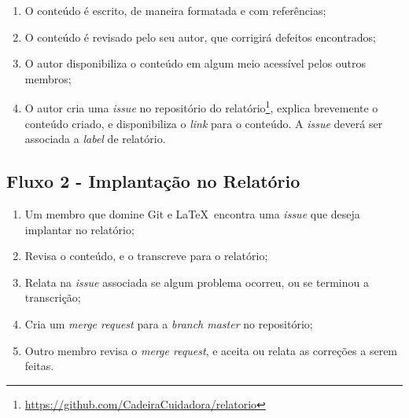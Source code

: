 \begin{enumerate}
  \item O conteúdo é escrito, de maneira formatada e com referências;
  \item O conteúdo é revisado pelo seu autor, que corrigirá defeitos encontrados;
  \item O autor disponibiliza o conteúdo em algum meio acessível pelos outros membros;
  \item O autor cria uma \textit{issue} no repositório do
    relatório\footnote{\url{https://github.com/CadeiraCuidadora/relatorio}}, explica brevemente
    o conteúdo criado, e disponibiliza o \textit{link} para o conteúdo. A \textit{issue} deverá ser associada a \textit{label} de relatório.
\end{enumerate}

\subsection{Fluxo 2 - Implantação no Relatório}

\begin{enumerate}
  \item Um membro que domine Git e \LaTeX\ encontra uma \textit{issue} que deseja
  implantar no relatório;
  \item Revisa o conteúdo, e o transcreve para o relatório;
  \item Relata na \textit{issue} associada se algum problema ocorreu, ou se terminou a transcrição;
  \item Cria um \textit{merge request} para a \textit{branch master} no repositório;
  \item Outro membro revisa o \textit{merge request}, e aceita ou relata as correções a serem feitas.
\end{enumerate}

